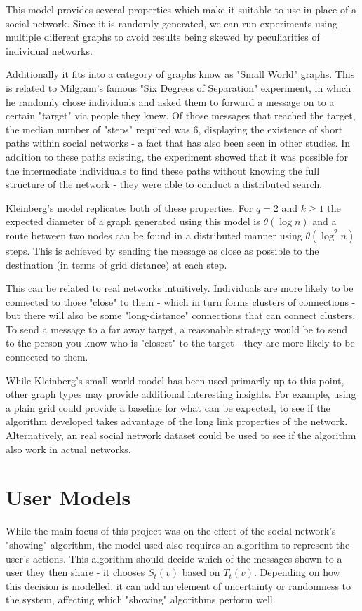 \documentclass[bsc,frontabs,twoside,singlespacing,parskip,deptreport]{infthesis}     %
\begin{document}
This model provides several properties which make it suitable to use in place of a social network. Since it is randomly generated, we can run experiments using multiple different graphs to avoid results being skewed by peculiarities of individual networks. 

Additionally it fits into a category of graphs know as "Small World" graphs. This is related to Milgram's famous "Six Degrees of Separation" experiment\cite{Milgram67,TraversMilgram69}, in which he randomly chose individuals and asked them to forward a message on to a certain "target" via people they knew. Of those messages that reached the target, the median number of "steps" required was 6, displaying the existence of short paths within social networks - a fact that has also been seen in other studies\cite{MilgramBackup1,MilgramBackup2}. In addition to these paths existing, the experiment showed that it was possible for the intermediate individuals to find these paths without knowing the full structure of the network - they were able to conduct a distributed search. 

Kleinberg's model replicates both of these properties. For $q = 2$ and $k \ge 1$ the expected diameter of a graph generated using this model is $\theta (\log n)$ and a route between two nodes can be found in a distributed manner using $\theta (\log^{2}n)$ steps\cite{AnalyzingKleinberg}. This is achieved by sending the message as close as possible to the destination (in terms of grid distance) at each step.

This can be related to real networks intuitively. Individuals are more likely to be connected to those "close" to them - which in turn forms clusters of connections - but there will also be some "long-distance" connections that can connect clusters. To send a message to a far away target, a reasonable strategy would be to send to the person you know who is "closest" to the target - they are more likely to be connected to them.

While Kleinberg's small world model has been used primarily up to this point, other graph types may provide additional interesting insights. For example, using a plain grid could provide a baseline for what can be expected, to see if the algorithm developed takes advantage of the long link properties of the network. Alternatively, an real social network dataset could be used to see if the algorithm also work in actual networks.

\section{User Models}
While the main focus of this project was on the effect of the social network's "showing" algorithm, the model used also requires an algorithm to represent the user's actions. This algorithm should decide which of the messages shown to a user they then share - it chooses $S_{t}(v)$ based on $T_{t}(v)$. Depending on how this decision is modelled, it can add an element of uncertainty or randomness to the system, affecting which "showing" algorithms perform well.
\end{document}
